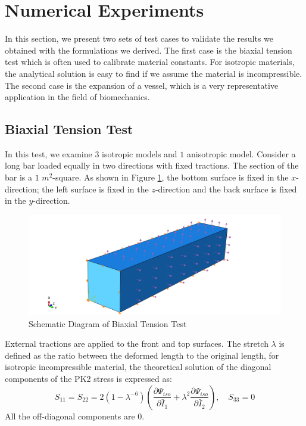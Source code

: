 \section{Numerical Experiments}
In this section, we present two sets of test cases to validate the results we obtained with the formulations we derived. The first case is the biaxial tension test which is often used to calibrate material constants. For isotropic materials, the analytical solution is easy to find if we assume the material is incompressible. The second case is the expansion of a vessel, which is a very representative application in the field of biomechanics.  

\subsection{Biaxial Tension Test}
\label{biaxial_tension_test}
In this test, we examine $3$ isotropic models and $1$ anisotropic model. Consider a long bar loaded equally in two directions with fixed tractions. The section of the bar is a $1$ $m^2$-square. As shown in Figure \ref{fig:biaxial_schematic}, the bottom surface is fixed in the $x$-direction; the left surface is fixed in the $z$-direction and the back surface is fixed in the $y$-direction. 

\begin{figure}[H]
\centering
\includegraphics[width=.8\textwidth]{./figures/biaxial_schematic.png}
\caption{Schematic Diagram of Biaxial Tension Test}
\label{fig:biaxial_schematic}
\end{figure}


External tractions are applied to the front and top surfaces. The stretch $\lambda$ is defined as the ratio between the deformed length to the original length, for isotropic incompressible material, the theoretical solution of the diagonal components of the PK2 stress is expressed as:
\begin{equation} \label{biaxialPK2}
S_{11} = S_{22} = 2(1 - {\lambda}^{-6})(\frac{\partial\Psi_{iso}}{\partial\bar{I}_1} + {\lambda}^2\frac{\partial\Psi_{iso}}{\partial\bar{I}_2}), \quad S_{33} = 0
\end{equation}
All the off-diagonal components are $0$.

